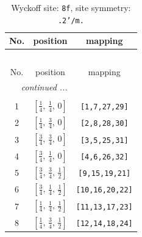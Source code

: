 \documentclass[fleqn,8pt]{jsarticle}
\begin{document}
\begin{longtable}{ccc}
\caption{Wyckoff site: {\tt 8f}, site symmetry: {\tt .2'/m.}}
 \\
 \hline \hline
No. & position & mapping \\ \hline \endfirsthead

\multicolumn{2}{l}{\tablename\ \thetable{}} \\
 \hline \hline
No. & position & mapping \\ \hline \endhead

 \hline \hline
\multicolumn{2}{r}{\footnotesize\it continued ...} \\ \endfoot

 \hline \hline
\multicolumn{2}{r}{} \\ \endlastfoot

1 & $\left[ \frac{1}{4},\, \frac{1}{4},\, 0 \right]$ & {\tt [1,7,27,29]} \\ \hline
2 & $\left[ \frac{1}{4},\, \frac{3}{4},\, 0 \right]$ & {\tt [2,8,28,30]} \\ \hline
3 & $\left[ \frac{3}{4},\, \frac{3}{4},\, 0 \right]$ & {\tt [3,5,25,31]} \\ \hline
4 & $\left[ \frac{3}{4},\, \frac{1}{4},\, 0 \right]$ & {\tt [4,6,26,32]} \\ \hline
5 & $\left[ \frac{3}{4},\, \frac{3}{4},\, \frac{1}{2} \right]$ & {\tt [9,15,19,21]} \\ \hline
6 & $\left[ \frac{3}{4},\, \frac{1}{4},\, \frac{1}{2} \right]$ & {\tt [10,16,20,22]} \\ \hline
7 & $\left[ \frac{1}{4},\, \frac{1}{4},\, \frac{1}{2} \right]$ & {\tt [11,13,17,23]} \\ \hline
8 & $\left[ \frac{1}{4},\, \frac{3}{4},\, \frac{1}{2} \right]$ & {\tt [12,14,18,24]} \\
\end{longtable}
\renewcommand{\arraystretch}{1.2}
\end{document}
